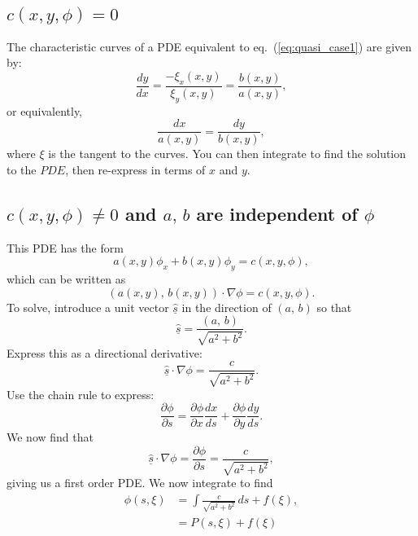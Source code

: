 \documentclass{article}
\begin{document}
\subsection{$c(x,y,\phi)=0$}
The characteristic curves of a PDE equivalent to eq.~(\ref{eq:quasi_case1}) are given by:
\begin{equation}
    \frac{dy}{dx} = \frac{-\xi_x(x,y)}{\xi_y(x,y)} = \frac{b(x,y)}{a(x,y)},
\end{equation}
or equivalently,
\begin{equation}
    \frac{dx}{a(x,y)} = \frac{dy}{b(x,y)},
\end{equation}
where $\xi$ is the tangent to the curves. You can then integrate to find the solution to the $PDE$, then re-express in terms of $x$ and $y$.

\subsection{$c(x,y,\phi)\neq0$ and $a,\,b$ are independent of $\phi$}\label{sec:quasi_case2}
This PDE has the form
\begin{equation}
    a(x,y)\phi_x + b(x,y)\phi_y = c(x,y,\phi),
\end{equation}
which can be written as
\begin{equation}
    (a(x,y),\,b(x,y))\cdot\nabla\phi = c(x,y,\phi).
\end{equation}
To solve, introduce a unit vector $\underline{\hat{s}}$ in the direction of $(a,\,b)$ so that
\begin{equation}
    \underline{\hat{s}} = \frac{(a,\,b)}{\sqrt{a^2+b^2}}.
\end{equation}
Express this as a directional derivative:
\begin{equation}
    \underline{\hat{s}}\cdot\nabla\phi = \frac{c}{\sqrt{a^2+b^2}}.
\end{equation}
Use the chain rule to express:
\begin{equation}
    \frac{\partial \phi}{\partial s} = \frac{\partial \phi}{\partial x}\frac{dx}{ds} + \frac{\partial \phi}{\partial y}\frac{dy}{ds}.
\end{equation}
We now find that
\begin{equation}
     \underline{\hat{s}}\cdot\nabla\phi =  \frac{\partial \phi}{\partial s} = \frac{c}{\sqrt{a^2+b^2}},
\end{equation}
giving us a first order PDE. We now integrate to find
\begin{align}
    \phi(s,\xi) &= \int \frac{c}{\sqrt{a^2+b^2}}\,ds + f(\xi), \\
    &= P(s,\xi) + f(\xi) \nonumber
\end{align}
\end{document}
